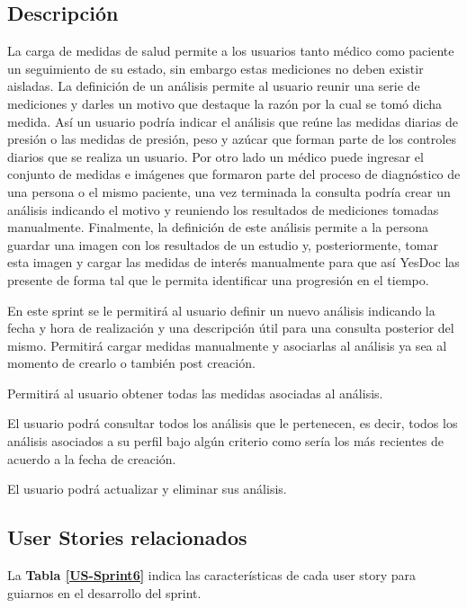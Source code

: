 \documentclass[a4paper,12pt]{article}
\begin{document}
\subsection{Descripción}

	La carga de medidas de salud permite a los usuarios tanto médico como paciente un seguimiento de su estado, sin embargo estas mediciones no deben existir aisladas. La definición de un análisis permite al usuario reunir una serie de mediciones y darles un motivo que destaque la razón por la cual se tomó dicha medida. Así un usuario podría indicar el análisis que reúne las medidas diarias de presión o las medidas de presión, peso y azúcar que forman parte de los controles diarios que se realiza un usuario. Por otro lado un médico puede ingresar el conjunto de medidas e imágenes que formaron parte del proceso de diagnóstico de una persona o el mismo paciente, una vez terminada la consulta podría crear un análisis indicando el motivo y reuniendo los resultados de mediciones tomadas manualmente. Finalmente, la definición de este análisis permite a la persona guardar una imagen con los resultados de un estudio y, posteriormente, tomar esta imagen y cargar las medidas de interés manualmente para que así YesDoc las presente de forma tal que le permita identificar una progresión en el tiempo.
	
	En este sprint se le permitirá al usuario definir un nuevo análisis indicando la fecha y hora de realización y una descripción útil para una consulta posterior del mismo. Permitirá cargar medidas manualmente y asociarlas al análisis ya sea al momento de crearlo o también post creación.
	
	Permitirá al usuario obtener todas las medidas asociadas al análisis.
	
	El usuario podrá consultar todos los análisis que le pertenecen, es decir, todos los análisis asociados a su perfil bajo algún criterio como sería los más recientes de acuerdo a la fecha de creación. 
	
	El usuario podrá actualizar y eliminar sus análisis.
	
	 

\subsection{User Stories relacionados}
La \textbf{Tabla \ref{US-Sprint6}} indica las características de cada user story para guiarnos en el desarrollo del sprint.
\end{document}
